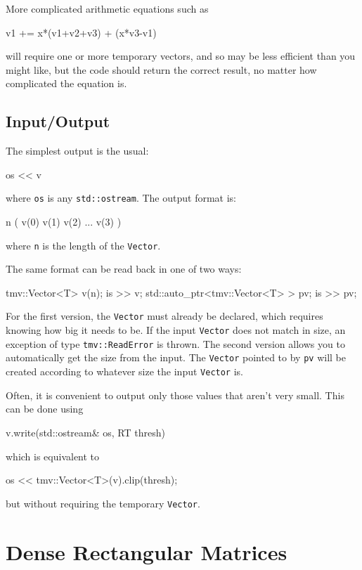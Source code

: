 \documentclass[twoside,letterpaper,11pt]{article}
\renewcommand{\tt}[1]{{\lstinline {#1}}}
\begin{document}
More complicated arithmetic equations such as
\begin{tmvcode}
v1 += x*(v1+v2+v3) + (x*v3-v1) 
\end{tmvcode}
will require one or more temporary vectors, and so may be less efficient than 
you might like, but the code should return the correct result, no matter
how complicated the equation is.

\subsection{Input/Output}

The simplest output is the usual:
\begin{tmvcode}
os << v
\end{tmvcode}
where \tt{os} is any \tt{std::ostream}.
The output format is:
\begin{tmvcode}
n ( v(0)  v(1)  v(2)  ...  v(3) )
\end{tmvcode}
where \tt{n} is the length of the \tt{Vector}.

The same format can be read back in one of two ways:
\begin{tmvcode}
tmv::Vector<T> v(n);
is >> v;
std::auto_ptr<tmv::Vector<T> > pv;
is >> pv;
\end{tmvcode}
For the first version, the \tt{Vector} must already be declared, which 
requires knowing how big it needs to be.  If the input \tt{Vector} does not
match in size, an exception of type \tt{tmv::ReadError} is thrown.
The second version allows you to automatically get the size from the input.  
The \tt{Vector} pointed to by \tt{pv}
will be created according to whatever size the input \tt{Vector} is.

Often, it is convenient to output only those values that aren't very small. 
This can be done using
\begin{tmvcode}
v.write(std::ostream& os, RT thresh)
\end{tmvcode}
which is equivalent to
\begin{tmvcode}
os << tmv::Vector<T>(v).clip(thresh);
\end{tmvcode}
but without requiring the temporary \tt{Vector}.

\newpage
\section{Dense Rectangular Matrices}
\end{document}
